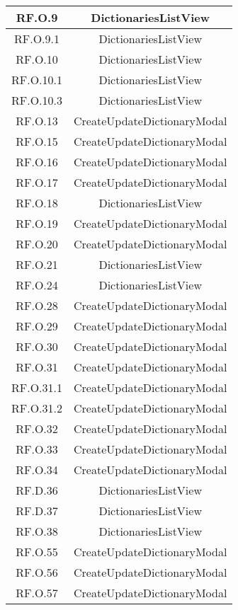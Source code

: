 \begin{adjustwidth}{-0.5cm}{-0.5cm}
\begin{longtable}{|c|c|}
    RF.O.9 & DictionariesListView \\
		\hline RF.O.9.1 & DictionariesListView \\
    \hline RF.O.10 & DictionariesListView \\
    \hline RF.O.10.1 & DictionariesListView \\
    \hline RF.O.10.3 & DictionariesListView \\
    \hline RF.O.13 & CreateUpdateDictionaryModal \\
    \hline RF.O.15 & CreateUpdateDictionaryModal \\
    \hline RF.O.16 & CreateUpdateDictionaryModal \\
    \hline RF.O.17 & CreateUpdateDictionaryModal \\
    \hline RF.O.18 & DictionariesListView \\
    \hline RF.O.19 & CreateUpdateDictionaryModal \\
    \hline RF.O.20 & CreateUpdateDictionaryModal \\
    \hline RF.O.21 & DictionariesListView \\
    \hline RF.O.24 & DictionariesListView \\
    \hline RF.O.28 & CreateUpdateDictionaryModal \\
    \hline RF.O.29 & CreateUpdateDictionaryModal \\
    \hline RF.O.30 & CreateUpdateDictionaryModal \\
    \hline RF.O.31 & CreateUpdateDictionaryModal \\
    \hline RF.O.31.1 & CreateUpdateDictionaryModal \\
    \hline RF.O.31.2 & CreateUpdateDictionaryModal \\
    \hline RF.O.32 & CreateUpdateDictionaryModal \\
    \hline RF.O.33 & CreateUpdateDictionaryModal \\
    \hline RF.O.34 & CreateUpdateDictionaryModal \\
    \hline RF.D.36 & DictionariesListView \\
    \hline RF.D.37 & DictionariesListView \\
    \hline RF.O.38 & DictionariesListView \\
    \hline RF.O.55 & CreateUpdateDictionaryModal \\
    \hline RF.O.56 & CreateUpdateDictionaryModal \\
    \hline RF.O.57 & CreateUpdateDictionaryModal \\
  \end{longtable}
\end{adjustwidth}
\egroup

